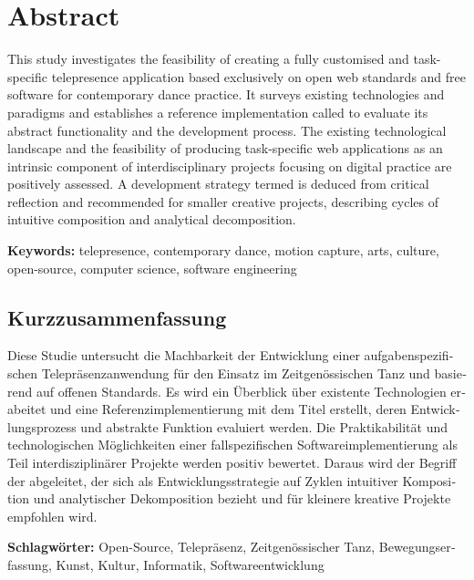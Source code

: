 \section*{Abstract}

This study investigates the feasibility of creating a fully customised and task-specific telepresence application based exclusively on open web standards and free software for contemporary dance practice.
It surveys existing technologies and paradigms and establishes a reference implementation called  to evaluate its abstract functionality and the development process.
The existing technological landscape and the feasibility of producing task-specific web applications as an intrinsic component of interdisciplinary projects focusing on digital practice are positively assessed.
A development strategy termed  is deduced from critical reflection and recommended for smaller creative projects, describing cycles of intuitive composition and analytical decomposition.

\textbf{Keywords:} telepresence, contemporary dance, motion capture, arts, culture, open-source, computer science, software engineering


\begin{otherlanguage}{ngerman}
\section*{Kurzzusammenfassung}
Diese Studie untersucht die Machbarkeit der Entwicklung einer aufgabenspezifischen Telepräsenzanwendung für den Einsatz im Zeitgenössischen Tanz und basierend auf offenen Standards.
Es wird ein Überblick über existente Technologien erabeitet und eine Referenzimplementierung mit dem Titel  erstellt, deren Entwicklungsprozess und abstrakte Funktion evaluiert werden.
Die Praktikabilität und technologischen Möglichkeiten einer fallspezifischen Softwareimplementierung als Teil interdisziplinärer Projekte werden positiv bewertet.
Daraus wird der Begriff der  abgeleitet, der sich als Entwicklungsstrategie auf Zyklen intuitiver Komposition und analytischer Dekomposition bezieht und für kleinere kreative Projekte empfohlen wird.
 
\textbf{Schlagwörter:} Open-Source, Telepräsenz, Zeitgenössischer Tanz, Bewegungserfassung, Kunst, Kultur, Informatik, Softwareentwicklung
\end{otherlanguage}